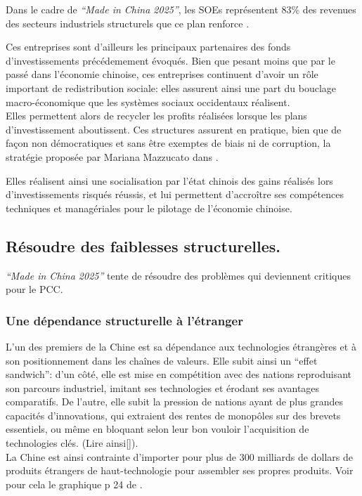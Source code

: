 \documentclass[a4paper]{article}
\begin{document}
Dans le cadre de \emph{“Made in China 2025”}, les SOEs représentent 83\% des revenues
des secteurs industriels structurels que ce plan renforce .\cite{Evolving_MiC25}

Ces entreprises sont d’ailleurs les principaux partenaires des fonds
d’in\-vestis\-sements précédemement évoqués. Bien que pesant moins que par le passé
dans l’économie chinoise, ces entreprises continuent d’avoir un rôle important
de redistribution sociale: elles assurent ainsi une part du bouclage
macro-économique que les systèmes sociaux occidentaux réalisent.\\

Elles permettent alors de recycler les profits réalisées lorsque les plans
d’in\-vestis\-sement aboutissent. Ces structures assurent en pratique, bien que de
façon non démocratiques et sans être exemptes de biais ni de corruption, la
stratégie proposée par Mariana Mazzucato dans \cite{mazzucato18}.

Elles réalisent ainsi une socialisation par l’état chinois des gains réalisés
lors d’investissements risqués réussis, et lui permettent d’accroître ses
compétences techniques et managériales pour le pilotage de l’économie chinoise.

\subsection{Résoudre des faiblesses structurelles.}
\label{sec:orgebd142e}
\emph{“Made in China 2025”} tente de résoudre des problèmes qui deviennent critiques
pour le PCC.

\subsubsection{Une dépendance structurelle à l’étranger}
\label{sec:orgd34c67b}
L’un des premiers de la Chine est sa dépendance aux technologies étrangères et à
son positionnement dans les chaînes de valeurs. Elle subit ainsi un “effet
sandwich”: d’un côté, elle est mise en compétition avec des nations reproduisant
son parcours industriel, imitant ses technologies et érodant ses avantages
comparatifs. De l’autre, elle subit la pression de nations ayant de plus grandes
capacités d’innovations, qui extraient des rentes de monopôles sur des brevets
essentiels, ou même en bloquant selon leur bon vouloir l’acquisition de
technologies clés. (Lire ainsi[\cite{dollar20_china}]).\\

La Chine est ainsi contrainte d’importer pour plus de 300 milliards de dollars
de produits étrangers de haut-technologie pour assembler ses propres produits.
Voir pour cela le graphique p 24 de \cite{Evolving_MiC25}.
\end{document}
